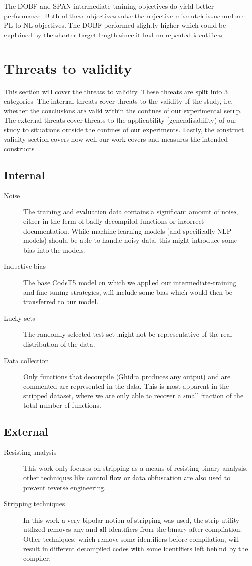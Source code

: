 The DOBF and SPAN intermediate-training objectives do yield better performance. Both of these objectives solve the objective mismatch issue and are PL-to-NL objectives. The DOBF performed slightly higher which could be explained by the shorter target length since it had no repeated identifiers.

\section{Threats to validity}

This section will cover the threats to validity. These threats are split into 3 categories. The internal threats cover threats to the validity of the study, i.e. whether the conclusions are valid within the confines of our experimental setup. The external threats cover threats to the applicability (generalisability) of our study to situations outside the confines of our experiments. Lastly, the construct validity section covers how well our work covers and measures the intended constructs.
\subsection{Internal}
    \begin{description}
        \item[Noise] The training and evaluation data contains a significant amount of noise, either in the form of badly decompiled functions or incorrect documentation. While machine learning models (and specifically NLP models) should be able to handle noisy data, this might introduce some bias into the models.
        \item[Inductive bias] The base CodeT5 model on which we applied our intermediate-training and fine-tuning strategies, will include some bias which would then be transferred to our model.
        \item[Lucky sets] The randomly selected test set might not be representative of the real distribution of the data.
        \item[Data collection] Only functions that decompile (Ghidra produces any output) and are commented are represented in the data. This is most apparent in the stripped dataset, where we are only able to recover a small fraction of the total number of functions. 
    \end{description}
\subsection{External}
    \begin{description}
        \item[Resisting analysis] This work only focuses on stripping as a means of resisting binary analysis, other techniques like control flow or data obfuscation are also used to prevent reverse engineering. 
        \item[Stripping techniques] In this work a very bipolar notion of stripping was used, the strip utility utilized removes any and all identifiers from the binary after compilation. Other techniques, which remove some identifiers before compilation, will result in different decompiled codes with some identifiers left behind by the compiler. 
    \end{description}
